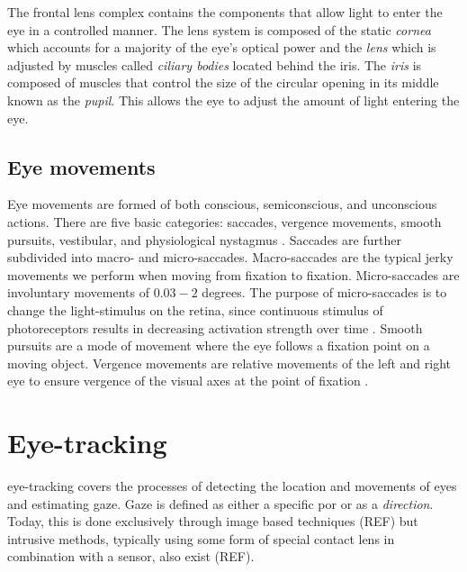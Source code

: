 The frontal lens complex contains the components that allow light to enter the eye in a controlled manner. The lens system is composed of the static \emph{cornea} which accounts for a majority of the eye's optical power and the \emph{lens} which is adjusted by muscles called \emph{ciliary bodies} located behind the iris. The \emph{iris} is composed of muscles that control the size of the circular opening in its middle known as the \emph{pupil}. This allows the eye to adjust the amount of light entering the eye. 

\subsection{Eye movements}
Eye movements are formed of both conscious, semiconscious, and unconscious actions. There are five basic categories: saccades, vergence movements, smooth pursuits, vestibular, and physiological nystagmus \parencite[39]{methodology}. Saccades are further subdivided into macro- and micro-saccades. Macro-saccades are the typical jerky movements we perform when moving from fixation to fixation. Micro-saccades are involuntary movements of $0.03-2$ degrees. The purpose of micro-saccades is to change the light-stimulus on the retina, since continuous stimulus of photoreceptors results in decreasing activation strength over time \parencite[44]{methodology}. Smooth pursuits are a mode of movement where the eye follows a fixation point on a moving object. Vergence movements are relative movements of the left and right eye to ensure vergence of the visual axes at the point of fixation \parencite{methodology}.


\section{Eye-tracking}\label{sec:eye-tracking}
\Gls{eye-tracking} covers the processes of detecting the location and movements of eyes and estimating \gls{gaze}. Gaze is defined as either a specific \acrfull{por} or as a \emph{direction}. Today, this is done exclusively through image based techniques (REF) but intrusive methods, typically using some form of special contact lens in combination with a sensor, also exist (REF).

